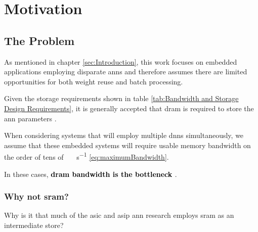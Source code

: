 



\section{Motivation}
\label{sec:Motivation}


\subsection[The Problem]{The Problem}
\label{sec:The Problem}

As mentioned in chapter \ref{sec:Introduction}, this work focuses on embedded applications employing disparate \ac{ann}s and therefore assumes there are limited opportunities for both weight reuse and batch processing.

Given the storage requirements shown in table \ref{tab:Bandwidth and Storage Design Requirements}, it is generally accepted that \ac{dram} is required to store the \ac{ann} parameters \cite{dadiannao2014}\cite{dadiannao2017}\cite{azarkhish2017neurostream}.

When considering systems that will employ multiple \ac{dnn}s simultaneously, we assume that these embedded systems will require usable memory bandwidth on the order of tens of \SI[per-mode=symbol]{}{\tera \bit \per \second} \eqref{eq:maximumBandwidth}.

In these cases, \textbf{\textcolor{black}{\ac{dram} bandwidth is the bottleneck} \cite{dadiannao2017}}.

\iffalse
Given the bandwidth and storage requirements shown in table \ref{tab:Bandwidth and Storage Design Requirements}, the problem becomes \hyphenquote{american}{\textbf{\textcolor{black}{to provide deterministic at or near real-time performance within tolerable power and space constraints for embedded systems employing inference on multiple disparate useful-sized neural networks.}}}
\fi


\subsubsection{Why not \ac{sram}?}
\label{sec:Why not SRAM}

Why is it that much of the \ac{asic} and \ac{asip} \ac{ann} research employs \ac{sram} as an intermediate store? 

